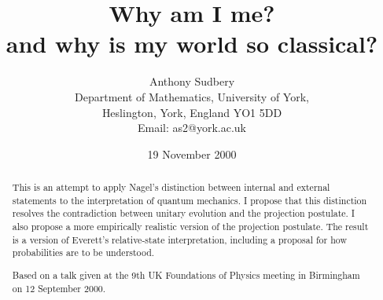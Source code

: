 \documentclass[12pt,a4paper,reqno]{article}
\renewcommand{\(}{\left(}
\renewcommand{\)}{\right)}
\newcommand{\<}{\langle}
\renewcommand{\>}{\rangle}
\theoremstyle{plain} %
\theoremstyle{definition}
\theoremstyle{remark}
\begin{document}
\title{Why am I me?\\ and why is my world so classical?}
\author{Anthony Sudbery\\[10pt] \small Department of Mathematics,    
University of York,\\[-2pt] \small Heslington, York, England YO1 5DD\\    
\small  Email: as2@york.ac.uk}
\date{19 November 2000}
\maketitle
\begin{abstract}
This is an attempt to apply Nagel's distinction between internal
and external statements to the interpretation of quantum mechanics. I
propose that this distinction resolves the contradiction between unitary
evolution and the projection postulate. I also propose a more empirically
realistic version of the projection postulate. The result is a version of
Everett's relative-state interpretation, including a proposal for how
probabilities are to be understood.

Based on a talk given at the 9th UK Foundations of Physics
meeting in Birmingham on 12 September 2000.

\end{abstract}

\newpage
\end{document}
